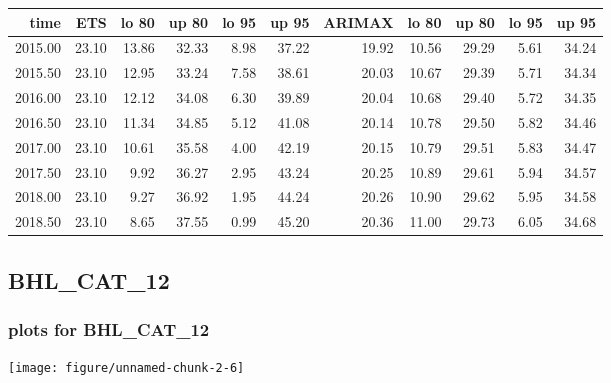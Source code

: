 \documentclass[10pt,a4paper]{article}\usepackage[]{graphicx}\usepackage[]{color}
\makeatletter
\def\maxwidth{ %
  \ifdim\Gin@nat@width>\linewidth
    \linewidth
  \else
    \Gin@nat@width
  \fi
}
\newcommand{\AaA}{\_}
\makeatother
\begin{document}
\begin{table}[ht]
\centering
\begin{tabular}{rrrrrrrrrrr}
  \hline
time & ETS  & lo 80 & up 80 & lo 95 & up 95 & ARIMAX  & lo 80 & up 80 & lo 95 & up 95 \\ 
  \hline
2015.00 & 23.10 & 13.86 & 32.33 & 8.98 & 37.22 & 19.92 & 10.56 & 29.29 & 5.61 & 34.24 \\ 
  2015.50 & 23.10 & 12.95 & 33.24 & 7.58 & 38.61 & 20.03 & 10.67 & 29.39 & 5.71 & 34.34 \\ 
  2016.00 & 23.10 & 12.12 & 34.08 & 6.30 & 39.89 & 20.04 & 10.68 & 29.40 & 5.72 & 34.35 \\ 
  2016.50 & 23.10 & 11.34 & 34.85 & 5.12 & 41.08 & 20.14 & 10.78 & 29.50 & 5.82 & 34.46 \\ 
  2017.00 & 23.10 & 10.61 & 35.58 & 4.00 & 42.19 & 20.15 & 10.79 & 29.51 & 5.83 & 34.47 \\ 
  2017.50 & 23.10 & 9.92 & 36.27 & 2.95 & 43.24 & 20.25 & 10.89 & 29.61 & 5.94 & 34.57 \\ 
  2018.00 & 23.10 & 9.27 & 36.92 & 1.95 & 44.24 & 20.26 & 10.90 & 29.62 & 5.95 & 34.58 \\ 
  2018.50 & 23.10 & 8.65 & 37.55 & 0.99 & 45.20 & 20.36 & 11.00 & 29.73 & 6.05 & 34.68 \\ 
   \hline
\end{tabular}
\end{table}

\newpage
\subsection{BHL\AaA CAT\AaA 12}
\subsubsection{plots for BHL\AaA CAT\AaA 12}

\texttt{[image: figure/unnamed-chunk-2-6]} 

\newpage
\end{document}
